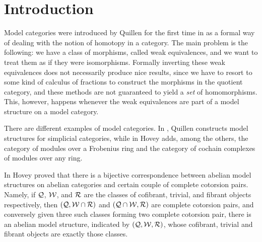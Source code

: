 \chapter*{Introduction}\label{ch:introduction}

Model categories were introduced by Quillen for the first time in \cite{Q} as a formal way of dealing with the notion of homotopy in a category. The main problem is the following: we have a class of morphisms, called weak equivalences, and we want to treat them as if they were isomorphisms. Formally inverting these weak equivalences does not necessarily produce nice results, since we have to resort to some kind of calculus of fractions to construct the morphisms in the quotient category, and these methods are not guaranteed to yield a \emph{set} of homomorphisms. This, however, happens whenever the weak equivalences are part of a model structure on a model category.

There are different examples of model categories. In \cite{Q}, Quillen constructs model structures for simplicial categories, while in \cite{Hov99} Hovey adds, among the others, the category of modules over a Frobenius ring and the category of cochain complexes of modules over any ring.

In \cite{Hov02} Hovey proved that there is a bijective correspondence between abelian model structures on abelian categories and certain couple of complete cotorsion pairs. Namely, if $\mathcal{Q}$, $\mathcal{W}$, and $\mathcal{R}$ are the classes of cofibrant, trivial, and fibrant objects respectively, then $(\mathcal{Q},\mathcal{W}\cap\mathcal{R})$ and $(\mathcal{Q}\cap\mathcal{W},\mathcal{R})$ are complete cotorsion pairs, and conversely given three such classes forming two complete cotorsion pair, there is an abelian model structure, indicated by $(\mathcal{Q},\mathcal{W},\mathcal{R})$, whose cofibrant, trivial and fibrant objects are exactly those classes.

